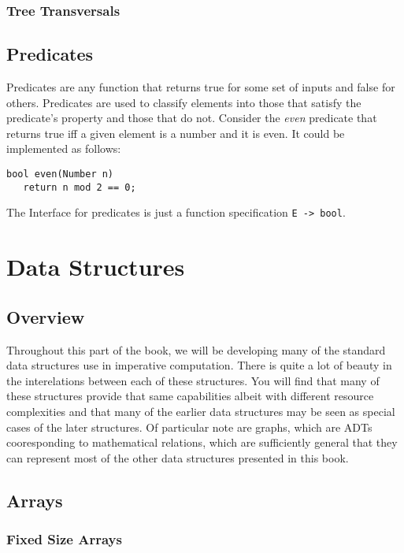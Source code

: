 \documentclass[12pt, letterpaper]{book}
\begin{document}
	\subsection{Tree Transversals} \label{Tree Transversals}

\section{Predicates}
Predicates are any function  that returns true for some set of inputs and false for others. Predicates are used to classify elements into those that satisfy the predicate's property and those that do not.
Consider the \textit{even} predicate that returns true iff a given element is a number and it is even. It could be implemented as follows:
\begin{verbatim}
bool even(Number n)
   return n mod 2 == 0;
\end{verbatim}

The Interface for predicates is just a function specification \texttt{E -> bool}.


\chapter{Data Structures} \label{Data Structures}

\section[Overview]{Overview}

Throughout this part of the book, we will be developing many of the standard data structures use in imperative computation. There is quite a lot of beauty in the interelations between each of these structures. You will find that many of these structures provide that same capabilities albeit with different resource complexities and that many of the earlier data structures may be seen as special cases of the later structures. Of particular note are graphs, which are ADTs cooresponding to mathematical relations, which are sufficiently general that they can represent most of the other data structures presented in this book.

\section{Arrays} \label{arrays}

\subsection{Fixed Size Arrays}
\end{document}
